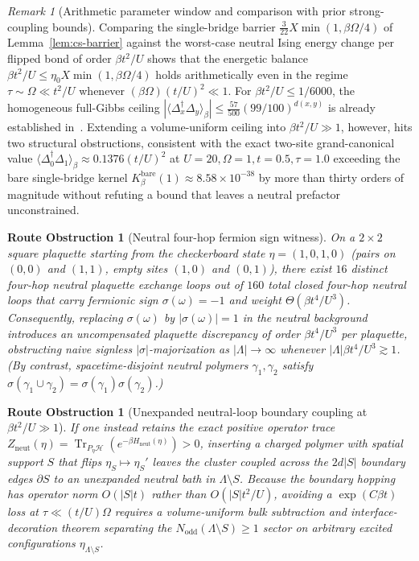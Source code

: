 \documentclass[11pt]{article}
\newtheorem{obstruction}[theorem]{Route Obstruction}
\theoremstyle{definition}
\theoremstyle{remark}
\newtheorem{remark}[theorem]{Remark}
\DeclareMathOperator{\Tr}{Tr}
\newcommand{\Dop}{\Delta}
\begin{document}
\begin{remark}[Arithmetic parameter window and comparison with prior strong-coupling bounds]
\label{rem:cs-window}
Comparing the single-bridge barrier $\frac{3}{22} X \min(1, \beta\Omega/4)$ of
Lemma~\ref{lem:cs-barrier} against the worst-case neutral Ising energy change
per flipped bond of order $\beta t^2/U$ shows that the energetic balance
$\beta t^2/U \le \eta_0 X \min(1,\beta\Omega/4)$ holds arithmetically even in
the regime $\tau \sim \Omega \ll t^2/U$ whenever $(\beta\Omega)(t/U)^2 \ll 1$.
For $\beta t^2/U \le 1/6000$, the homogeneous full-Gibbs ceiling
$|\langle \Dop_x^\dagger \Dop_y\rangle_\beta| \le \frac{57}{500}(99/100)^{d(x,y)}$
is already established in~\cite{strong}. Extending a volume-uniform ceiling into
$\beta t^2/U \gg 1$, however, hits two structural obstructions, consistent with
the exact two-site grand-canonical value $\langle \Dop_0^\dagger \Dop_1 \rangle_\beta \approx 0.1376(t/U)^2$
at $U=20,\Omega=1,t=0.5,\tau=1.0$ exceeding the bare single-bridge kernel
$K_\beta^{\mathrm{bare}}(1) \approx 8.58 \times 10^{-38}$ by more than thirty
orders of magnitude without refuting a bound that leaves a neutral prefactor
unconstrained.
\end{remark}

\begin{obstruction}[Neutral four-hop fermion sign witness]
\label{obs:cs-sign}
On a $2 \times 2$ square plaquette starting from the checkerboard state
$\eta = (1,0,1,0)$ (pairs on $(0,0)$ and $(1,1)$, empty sites $(1,0)$ and $(0,1)$),
there exist $16$ distinct four-hop neutral plaquette exchange loops out of $160$
total closed four-hop neutral loops that carry fermionic sign $\sigma(\omega) = -1$
and weight $\Theta(\beta t^4/U^3)$. Consequently, replacing $\sigma(\omega)$ by
$|\sigma(\omega)| = 1$ in the neutral background introduces an uncompensated
plaquette discrepancy of order $\beta t^4/U^3$ per plaquette, obstructing
naive signless $|\sigma|$-majorization as $|\Lambda| \to \infty$ whenever
$|\Lambda|\beta t^4/U^3 \gtrsim 1$. (By contrast, spacetime-disjoint neutral
polymers $\gamma_1, \gamma_2$ satisfy $\sigma(\gamma_1 \cup \gamma_2) = \sigma(\gamma_1)\sigma(\gamma_2)$.)
\end{obstruction}

\begin{obstruction}[Unexpanded neutral-loop boundary coupling at $\beta t^2/U \gg 1$]
\label{obs:cs-boundary}
If one instead retains the exact positive operator trace
$Z_{\mathrm{neut}}(\eta) = \Tr_{P_\eta \mathcal{H}}(e^{-\beta H_{\mathrm{neut}}(\eta)}) > 0$,
inserting a charged polymer with spatial support $S$ that flips $\eta_S \mapsto \eta_S'$
leaves the cluster coupled across the $2d|S|$ boundary edges $\partial S$ to an
unexpanded neutral bath in $\Lambda \setminus S$. Because the boundary hopping
has operator norm $O(|S|t)$ rather than $O(|S|t^2/U)$, avoiding a $\exp(C\beta t)$
loss at $\tau \ll (t/U)\Omega$ requires a volume-uniform bulk subtraction and
interface-decoration theorem separating the $N_{\mathrm{odd}}(\Lambda \setminus S) \ge 1$
sector on arbitrary excited configurations $\eta_{\Lambda\setminus S}$.
\end{obstruction}
\end{document}
